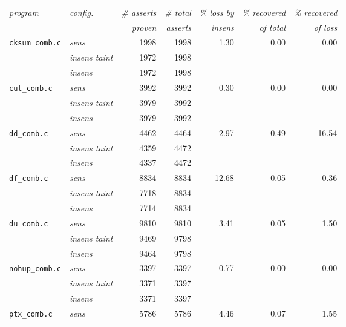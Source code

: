       \begin{figure}
        \centering
        \begin{tabular}{l|l||r|r||r|r|r}
          \textit{program} & \textit{config.} & \textit{\# asserts} & \textit{\# total} & \textit{\% loss by} & \textit{\% recovered} & \textit{\% recovered}\\
            &  & \textit{proven} & \textit{asserts} & \textit{insens} & \textit{of total} & \textit{of loss}\\
          \hline
          \texttt{cksum\_comb.c} & \textit{sens} & 1998 & 1998 & 1.30 & 0.00 & 0.00\\
          & \textit{insens taint} & 1972 & 1998 & & & \\
          & \textit{insens} & 1972 & 1998 & & & \\
          \hline
          \texttt{cut\_comb.c} & \textit{sens} & 3992 & 3992 & 0.30 & 0.00 & 0.00\\
          & \textit{insens taint} & 3979 & 3992 & & & \\
          & \textit{insens} & 3979 & 3992 & & & \\
          \hline
          \texttt{dd\_comb.c} & \textit{sens} & 4462 & 4464 & 2.97 & 0.49 & 16.54\\
          & \textit{insens taint} & 4359 & 4472 & & & \\
          & \textit{insens} & 4337 & 4472 & & & \\
          \hline          
          \texttt{df\_comb.c} & \textit{sens} & 8834 & 8834 & 12.68 & 0.05 & 0.36\\
          & \textit{insens taint} & 7718 & 8834 & & & \\
          & \textit{insens} & 7714 & 8834 & & & \\
          \hline         
          \texttt{du\_comb.c} & \textit{sens} & 9810 & 9810 & 3.41 & 0.05 & 1.50\\
          & \textit{insens taint} & 9469 & 9798 & & & \\
          & \textit{insens} & 9464 & 9798 & & & \\
          \hline         
          \texttt{nohup\_comb.c} & \textit{sens} & 3397 & 3397 & 0.77 & 0.00 & 0.00\\
          & \textit{insens taint} & 3371 & 3397 & & & \\
          & \textit{insens} & 3371 & 3397 & & & \\
          \hline         
          \texttt{ptx\_comb.c} & \textit{sens} & 5786 & 5786 & 4.46 & 0.07 & 1.55\\

\end{tabular}
\end{figure}
